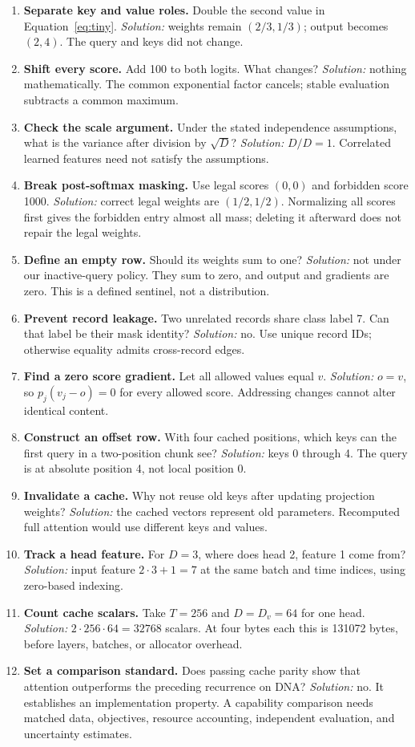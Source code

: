 \begin{enumerate}
\item \textbf{Separate key and value roles.} Double the second value in Equation~\ref{eq:tiny}.
\emph{Solution:} weights remain $(2/3,1/3)$; output becomes $(2,4)$. The query and keys did not change.
\item \textbf{Shift every score.} Add 100 to both logits. What changes?
\emph{Solution:} nothing mathematically. The common exponential factor cancels; stable evaluation subtracts a common maximum.
\item \textbf{Check the scale argument.} Under the stated independence assumptions, what is the variance after division by $\sqrt D$?
\emph{Solution:} $D/D=1$. Correlated learned features need not satisfy the assumptions.
\item \textbf{Break post-softmax masking.} Use legal scores $(0,0)$ and forbidden score 1000.
\emph{Solution:} correct legal weights are $(1/2,1/2)$. Normalizing all scores first gives the forbidden entry almost all mass; deleting it afterward does not repair the legal weights.
\item \textbf{Define an empty row.} Should its weights sum to one?
\emph{Solution:} not under our inactive-query policy. They sum to zero, and output and gradients are zero. This is a defined sentinel, not a distribution.
\item \textbf{Prevent record leakage.} Two unrelated records share class label 7. Can that label be their mask identity?
\emph{Solution:} no. Use unique record IDs; otherwise equality admits cross-record edges.
\item \textbf{Find a zero score gradient.} Let all allowed values equal $v$.
\emph{Solution:} $o=v$, so $p_j(v_j-o)=0$ for every allowed score. Addressing changes cannot alter identical content.
\item \textbf{Construct an offset row.} With four cached positions, which keys can the first query in a two-position chunk see?
\emph{Solution:} keys 0 through 4. The query is at absolute position 4, not local position 0.
\item \textbf{Invalidate a cache.} Why not reuse old keys after updating projection weights?
\emph{Solution:} the cached vectors represent old parameters. Recomputed full attention would use different keys and values.
\item \textbf{Track a head feature.} For $D=3$, where does head 2, feature 1 come from?
\emph{Solution:} input feature $2\cdot3+1=7$ at the same batch and time indices, using zero-based indexing.
\item \textbf{Count cache scalars.} Take $T=256$ and $D=D_v=64$ for one head.
\emph{Solution:} $2\cdot256\cdot64=32768$ scalars. At four bytes each this is 131072 bytes, before layers, batches, or allocator overhead.
\item \textbf{Set a comparison standard.} Does passing cache parity show that attention outperforms the preceding recurrence on DNA?
\emph{Solution:} no. It establishes an implementation property. A capability comparison needs matched data, objectives, resource accounting, independent evaluation, and uncertainty estimates.
\end{enumerate}

